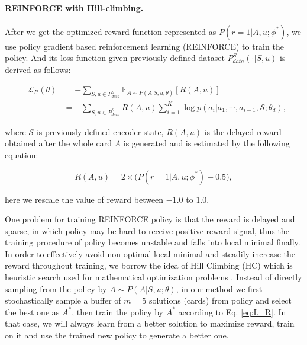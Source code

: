 \paragraph{REINFORCE with Hill-climbing.}
After we get the optimized reward function represented as $P(r=1|A,u;\phi^*)$,
we use policy gradient based reinforcement learning (REINFORCE) \cite{sutton2000policy,wang2017irgan} to train the policy.
And its loss function given previously defined dataset $P_{data}^{S}(\cdot|S,u)$ is derived as follows:
\begin{small}
\begin{eqnarray}
\label{eq:L_R}
&\mathcal{L}_{R}(\theta) & = -\sum_{S,u\in P_{data}^{S}}\mathbb{E}_{A\sim P(A|S,u;\theta)}[R(A,u)] \\
& & = -\sum_{S,u\in P_{data}^{S}}R(A,u)\sum_{i=1}^{K}\log{p(a_i|a_1,\cdots,a_{i-1},\mathcal{S};\theta_d)}, \nonumber
\end{eqnarray}
\end{small}
where $\mathcal{S}$ is previously defined encoder state,
$R(A,u)$ is the delayed reward \cite{yu2017seqgan} obtained after the whole card $A$ is generated
and is estimated by the following equation:
\begin{small}
\begin{equation}
\label{eq:reward}
R(A,u) = 2\times\big(P(r=1|A,u;\phi^*)-0.5\big),
\end{equation}
\end{small}
here we rescale the value of reward between $-1.0$ to $1.0$.

One problem for training REINFORCE policy is that the reward is delayed and sparse,
in which policy may be hard to receive positive reward signal, thus the training procedure of policy becomes unstable and falls into local minimal finally.
In order to effectively avoid non-optimal local minimal and steadily increase the reward throughout training,
we borrow the idea of Hill Climbing (HC) which is heuristic search used for mathematical optimization problems \cite{hu2018multi}. 
Instead of directly sampling from the policy by $A\sim P(A|S,u;\theta)$,
in our method we first stochastically sample a buffer of $m=5$ solutions (cards) from policy and select the best one as $A^*$,
then train the policy by $A^*$ according to Eq. \ref{eq:L_R}.
In that case, we will always learn from a better solution to maximize reward, 
train on it and use the trained new policy to generate a better one. 

